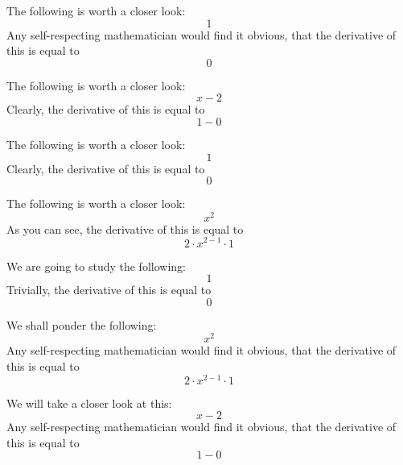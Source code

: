 \documentclass{article}
\begin{document}
The following is worth a closer look:
\begin{equation}
1 
\end{equation}
Any self-respecting mathematician would find it obvious, that the derivative of this is equal to
\begin{equation}
0 
\end{equation}

The following is worth a closer look:
\begin{equation}
x - 2 
\end{equation}
Clearly, the derivative of this is equal to
\begin{equation}
1 - 0 
\end{equation}

The following is worth a closer look:
\begin{equation}
1 
\end{equation}
Clearly, the derivative of this is equal to
\begin{equation}
0 
\end{equation}

The following is worth a closer look:
\begin{equation}
x ^{2 } 
\end{equation}
As you can see, the derivative of this is equal to
\begin{equation}
2 \cdot x ^{2 - 1 } \cdot 1 
\end{equation}

We are going to study the following:
\begin{equation}
1 
\end{equation}
Trivially, the derivative of this is equal to
\begin{equation}
0 
\end{equation}

We shall ponder the following:
\begin{equation}
x ^{2 } 
\end{equation}
Any self-respecting mathematician would find it obvious, that the derivative of this is equal to
\begin{equation}
2 \cdot x ^{2 - 1 } \cdot 1 
\end{equation}

We will take a closer look at this:
\begin{equation}
x - 2 
\end{equation}
Any self-respecting mathematician would find it obvious, that the derivative of this is equal to
\begin{equation}
1 - 0 
\end{equation}
\end{document}
